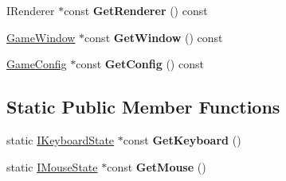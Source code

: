 \begin{DoxyCompactItemize}
\item 
\hypertarget{class_vixen_1_1_game_a3ee45729c63e670e49956dce406406d6}{}I\+Renderer $\ast$const {\bfseries Get\+Renderer} () const \label{class_vixen_1_1_game_a3ee45729c63e670e49956dce406406d6}

\item 
\hypertarget{class_vixen_1_1_game_a58718d4efafc76fab2e4687c2648caff}{}\hyperlink{class_vixen_1_1_game_window}{Game\+Window} $\ast$const {\bfseries Get\+Window} () const \label{class_vixen_1_1_game_a58718d4efafc76fab2e4687c2648caff}

\item 
\hypertarget{class_vixen_1_1_game_a6816f8e6057cbc2fa56b1163073891c0}{}\hyperlink{class_vixen_1_1_game_config}{Game\+Config} $\ast$const {\bfseries Get\+Config} () const \label{class_vixen_1_1_game_a6816f8e6057cbc2fa56b1163073891c0}

\end{DoxyCompactItemize}
\subsection*{Static Public Member Functions}
\begin{DoxyCompactItemize}
\item 
\hypertarget{class_vixen_1_1_game_add386b07418fc7e82e3e08884b9d6e81}{}static \hyperlink{class_vixen_1_1_i_keyboard_state}{I\+Keyboard\+State} $\ast$const {\bfseries Get\+Keyboard} ()\label{class_vixen_1_1_game_add386b07418fc7e82e3e08884b9d6e81}

\item 
\hypertarget{class_vixen_1_1_game_a35eaa19cca018f0536806ddccafc10c5}{}static \hyperlink{class_vixen_1_1_i_mouse_state}{I\+Mouse\+State} $\ast$const {\bfseries Get\+Mouse} ()\label{class_vixen_1_1_game_a35eaa19cca018f0536806ddccafc10c5}

\end{DoxyCompactItemize}
